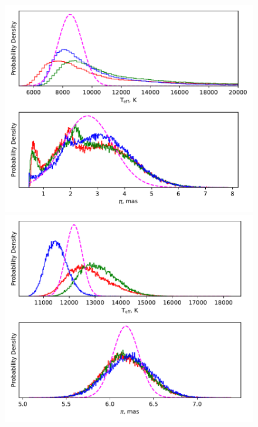 \begin{figure}
    \centering
    \includegraphics[width=\columnwidth, trim={0cm 6.5cm 0cm 0cm}, clip]{figures/results/three_cvs_with_weird_colours/ASASSN-17jf/PhysicalParams/all_gamma_asassn17jf.pdf}
    \includegraphics[width=\columnwidth, trim={0cm 6.5cm 0cm 0cm}, clip]{figures/results/three_cvs_with_weird_colours/ASASSN-16kr/PhysicalParams/all_gamma_asassn16kr.pdf}

\end{figure}
